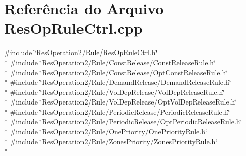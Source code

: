 \section{Referência do Arquivo Res\+Op\+Rule\+Ctrl.\+cpp}
\label{_res_op_rule_ctrl_8cpp}
{\ttfamily \#include \char`\"{}Res\+Operation2/\+Rule/\+Res\+Op\+Rule\+Ctrl.\+h\char`\"{}}\\*
{\ttfamily \#include \char`\"{}Res\+Operation2/\+Rule/\+Const\+Release/\+Const\+Release\+Rule.\+h\char`\"{}}\\*
{\ttfamily \#include \char`\"{}Res\+Operation2/\+Rule/\+Const\+Release/\+Opt\+Const\+Release\+Rule.\+h\char`\"{}}\\*
{\ttfamily \#include \char`\"{}Res\+Operation2/\+Rule/\+Demand\+Release/\+Demand\+Release\+Rule.\+h\char`\"{}}\\*
{\ttfamily \#include \char`\"{}Res\+Operation2/\+Rule/\+Vol\+Dep\+Release/\+Vol\+Dep\+Release\+Rule.\+h\char`\"{}}\\*
{\ttfamily \#include \char`\"{}Res\+Operation2/\+Rule/\+Vol\+Dep\+Release/\+Opt\+Vol\+Dep\+Release\+Rule.\+h\char`\"{}}\\*
{\ttfamily \#include \char`\"{}Res\+Operation2/\+Rule/\+Periodic\+Release/\+Periodic\+Release\+Rule.\+h\char`\"{}}\\*
{\ttfamily \#include \char`\"{}Res\+Operation2/\+Rule/\+Periodic\+Release/\+Opt\+Periodic\+Release\+Rule.\+h\char`\"{}}\\*
{\ttfamily \#include \char`\"{}Res\+Operation2/\+Rule/\+One\+Priority/\+One\+Priority\+Rule.\+h\char`\"{}}\\*
{\ttfamily \#include \char`\"{}Res\+Operation2/\+Rule/\+Zones\+Priority/\+Zones\+Priority\+Rule.\+h\char`\"{}}\\*
